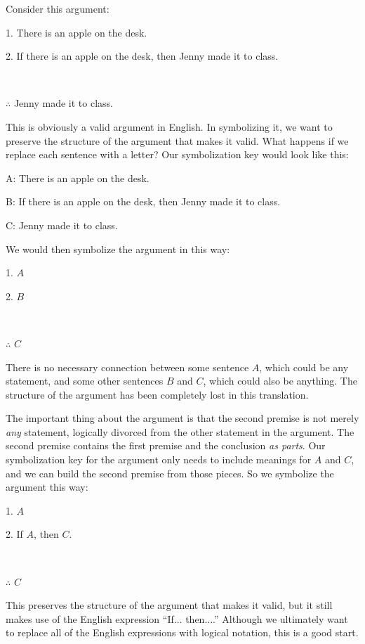 Consider this argument:
\begin{earg}
\item[1.] There is an apple on the desk.
\item[2.] If there is an apple on the desk, then Jenny made it to class.
\item[] \textcolor{white}{.}\sout{\hspace{.8\linewidth}}\textcolor{white}{.} 
\item[$\therefore$] Jenny made it to class.
\end{earg}
This is obviously a valid argument in English. In symbolizing it, we want to preserve the structure of the argument that makes it valid.
What happens if we replace each sentence with a letter? Our symbolization key would look like this:
\begin{ekey}
\item[A:]There is an apple on the desk.
\item[B:]If there is an apple on the desk, then Jenny made it to class.
\item[C:]Jenny made it to class.
\end{ekey}
We would then symbolize the argument in this way:
\begin{earg}
\item[1.] $A$
\item[2.] $B$
\item[] \textcolor{white}{.}\sout{\hspace{.05\linewidth}}\textcolor{white}{.} 
\item[$\therefore$] $C$
\end{earg}
There is no necessary connection between some sentence $A$, which could be any statement, and some other sentences $B$ and $C$, which could also be anything.
The structure of the argument has been completely lost in this translation.

The important thing about the argument is that the second premise is not merely \emph{any} statement, logically divorced from the other statement in the argument. The second premise contains the first premise and the conclusion \emph{as parts}. Our symbolization key for the argument only needs to include meanings for $A$ and $C$, and we can build the second premise from those pieces. So we symbolize the argument this way:
\begin{earg}
\item[1.] $A$
\item[2.] If $A$, then $C$.
\item[] \textcolor{white}{.}\sout{\hspace{.2\linewidth}}\textcolor{white}{.} 
\item[$\therefore$] $C$
\end{earg}
This preserves the structure of the argument that makes it valid, but it still makes use of the English expression ``If$\ldots$ then$\ldots$.'' Although we ultimately want to replace all of the English expressions with logical notation, this is a good start.

